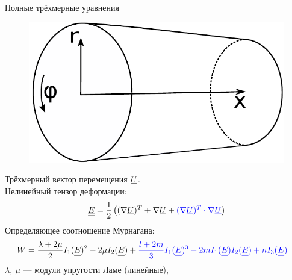 \documentclass[usenames,dvipsnames]{beamer}
\DeclareMathOperator{\trace}{tr}
\newcommand{\lb}{\left (}
\newcommand{\rb}{\right )}
\newcommand{\vect}[1]{\underline{#1}}
\newcommand{\tens}[1]{\underline{\underline{#1}}}
\begin{document}
\begin{frame}{Полные трёхмерные уравнения}
\begin{figure}
	\vspace{-2mm}
	\includegraphics[width=\linewidth]{Figures/1_RodSchematic}
\end{figure}
Трёхмерный вектор перемещения $\color{black}\vect{U}$.\\
\vspace{1mm}
Нелинейный тензор деформации:
\begin{equation*}
\tens{E} = \frac12 \lb(\nabla\vect{U})^T + \nabla\vect{U} + {\color{blue}(\nabla\vect{U})^T\cdot\nabla\vect{U}}\rb
\end{equation*}
Определяющее соотношение Мурнагана:
\small
\begin{align*}
&W = \frac{\lambda + 2\mu}{2}I_1(\tens{E})^2 - 2\mu I_2(\tens{E}) +\color{blue} \frac{l+2m}{3}I_1(\tens{E})^3 - 2m I_1(\tens{E}) I_2(\tens{E}) + n I_3(\tens{E})
\end{align*}
$\lambda,\ \mu$ --- модули упругости Ламе (линейные),\\

\end{frame}
\end{document}
